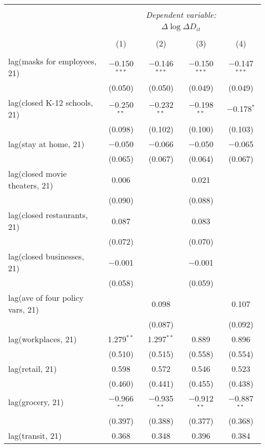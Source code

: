 \begin{tabular}{@{\extracolsep{1pt}}lcccc} 
\\[-1.8ex]\hline 
\hline \\[-1.8ex] 
 & \multicolumn{4}{c}{\textit{Dependent variable:}} \\ 
\cline{2-5} 
 & \multicolumn{4}{c}{$\Delta \log \Delta D_{it}$} \\ 
\\[-1.8ex] & (1) & (2) & (3) & (4)\\ 
\hline \\[-1.8ex] 
 lag(masks for employees, 21) & $-$0.150$^{***}$ & $-$0.146$^{***}$ & $-$0.150$^{***}$ & $-$0.147$^{***}$ \\ 
  & (0.050) & (0.050) & (0.049) & (0.049) \\ 
  lag(closed K-12 schools, 21) & $-$0.250$^{**}$ & $-$0.232$^{**}$ & $-$0.198$^{**}$ & $-$0.178$^{*}$ \\ 
  & (0.098) & (0.102) & (0.100) & (0.103) \\ 
  lag(stay at home, 21) & $-$0.050 & $-$0.066 & $-$0.050 & $-$0.065 \\ 
  & (0.065) & (0.067) & (0.064) & (0.067) \\ 
  lag(closed movie theaters, 21) & 0.006 &  & 0.021 &  \\ 
  & (0.090) &  & (0.088) &  \\ 
  lag(closed restaurants, 21) & 0.087 &  & 0.083 &  \\ 
  & (0.072) &  & (0.070) &  \\ 
  lag(closed businesses, 21) & $-$0.001 &  & $-$0.001 &  \\ 
  & (0.058) &  & (0.059) &  \\ 
  lag(ave of four policy vars, 21) &  & 0.098 &  & 0.107 \\ 
  &  & (0.087) &  & (0.092) \\ 
  lag(workplaces, 21) & 1.279$^{**}$ & 1.297$^{**}$ & 0.889 & 0.896 \\ 
  & (0.510) & (0.515) & (0.558) & (0.554) \\ 
  lag(retail, 21) & 0.598 & 0.572 & 0.546 & 0.523 \\ 
  & (0.460) & (0.441) & (0.455) & (0.438) \\ 
  lag(grocery, 21) & $-$0.966$^{**}$ & $-$0.935$^{**}$ & $-$0.912$^{**}$ & $-$0.887$^{**}$ \\ 
  & (0.397) & (0.388) & (0.377) & (0.368) \\ 
  lag(transit, 21) & 0.368 & 0.348 & 0.396 & 0.384 \\ 

\end{tabular}
